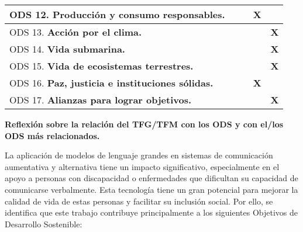 \documentclass[11pt]{article}
\begin{document}
\begin{tabular}{|l|c|c|c|c|}
ODS 12. \textbf{Producci\'on y consumo responsables.}          & & & \textbf{X} & \\ \hline
ODS 13. \textbf{Acci\'on por el clima.}                        & & & & \textbf{X} \\ \hline
ODS 14. \textbf{Vida submarina.}                               & & & & \textbf{X} \\ \hline
ODS 15. \textbf{Vida de ecosistemas terrestres.}               & & & & \textbf{X} \\ \hline
ODS 16. \textbf{Paz, justicia e instituciones s\'olidas.}      & & & \textbf{X} & \\ \hline
ODS 17. \textbf{Alianzas para lograr objetivos.}               & & &  & \textbf{X} \\ \hline
\end{tabular}

\newpage

\phantom{x}

\vspace{1ex}

\textbf{Reflexi\'on sobre la relaci\'on del TFG/TFM con los ODS y con el/los ODS m\'as relacionados.}

\vspace{1ex}

La aplicación de modelos de lenguaje grandes en sistemas de comunicación aumentativa y alternativa tiene un impacto significativo, especialmente en el apoyo a personas con discapacidad o enfermedades que dificultan su capacidad de comunicarse verbalmente. Esta tecnología tiene un gran potencial para mejorar la calidad de vida de estas personas y facilitar su inclusión social. Por ello, se identifica que este trabajo contribuye principalmente a los siguientes Objetivos de Desarrollo Sostenible:
\end{document}
